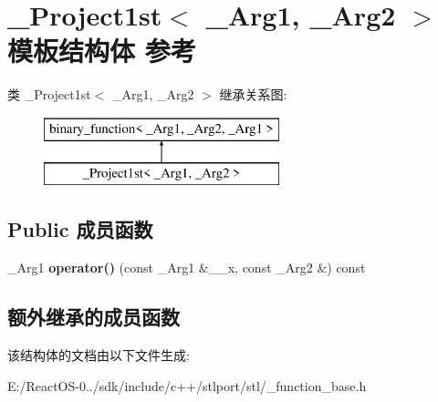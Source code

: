 \hypertarget{struct___project1st}{}\section{\+\_\+\+Project1st$<$ \+\_\+\+Arg1, \+\_\+\+Arg2 $>$ 模板结构体 参考}
\label{struct___project1st}
类 \+\_\+\+Project1st$<$ \+\_\+\+Arg1, \+\_\+\+Arg2 $>$ 继承关系图\+:\begin{figure}[H]
\begin{center}
\leavevmode
\includegraphics[height=2.000000cm]{struct___project1st}
\end{center}
\end{figure}
\subsection*{Public 成员函数}
\begin{DoxyCompactItemize}
\item 
\mbox{\label{struct___project1st_ae28cc2663e8cd313dc1a41a13d7b0811}} 
\+\_\+\+Arg1 {\bfseries operator()} (const \+\_\+\+Arg1 \&\+\_\+\+\_\+x, const \+\_\+\+Arg2 \&) const
\end{DoxyCompactItemize}
\subsection*{额外继承的成员函数}


该结构体的文档由以下文件生成\+:\begin{DoxyCompactItemize}
\item 
E\+:/\+React\+O\+S-\/0../sdk/include/c++/stlport/stl/\+\_\+function\+\_\+base.\+h\end{DoxyCompactItemize}
